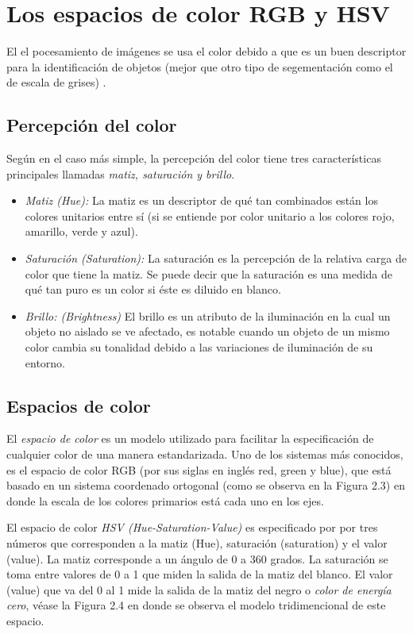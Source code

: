 	\section{Los espacios de color RGB y HSV}
El el pocesamiento de imágenes se usa el color debido a que es un buen descriptor para la identificación de objetos (mejor que otro tipo de segementación como el de escala de grises) \cite{gonzalez2002digital}.
		\subsection*{Percepción del color}
Según \cite{agoston2005computer} en el caso más simple, la percepción del color tiene tres características principales llamadas \textit{matiz, saturación y brillo}. 
\begin{itemize}
\item \textit{Matiz (Hue):} La matiz es un descriptor de qué tan combinados están los colores unitarios entre sí (si se entiende por color unitario a los colores rojo, amarillo, verde y azul).

\item \textit{Saturación (Saturation): } La saturación es la percepción de la relativa carga de color que tiene la matiz. Se puede decir que la saturación es una medida de qué tan puro es un color si éste es diluido en blanco.

\item \textit{Brillo: (Brightness)} El brillo es un atributo de la iluminación en la cual un objeto no aislado se ve afectado, es notable cuando un objeto de un  mismo color cambia su tonalidad debido a las variaciones de iluminación de su entorno.
\end{itemize}
		\subsection*{Espacios de color}
El \textit{espacio de color} es un modelo utilizado para facilitar la especificación de cualquier color de una manera estandarizada. Uno de los sistemas más conocidos, es el espacio de color RGB (por sus siglas en inglés red, green y blue), que está basado en un sistema coordenado ortogonal (como se observa en la Figura 2.3) en donde la escala de los colores primarios está cada uno en los ejes.

El espacio de color \textit{HSV (Hue-Saturation-Value)} es especificado por por tres números que corresponden a la matiz (Hue), saturación (saturation) y el valor (value). La matiz corresponde a un ángulo de 0 a 360 grados. La saturación se toma entre valores de 0 a 1 que miden la salida de la matiz del blanco. El valor (value) que va del 0 al 1 mide la salida de la matiz del negro o \textit{color de energía cero}, véase la Figura 2.4 en donde se observa el modelo tridimencional de este espacio.

